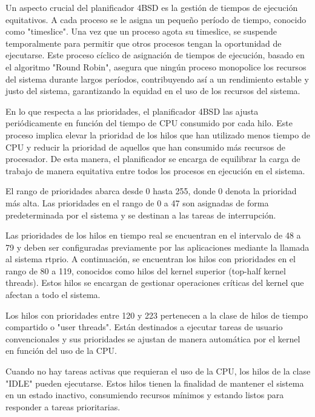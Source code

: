 Un aspecto crucial del planificador 4BSD es la gestión de tiempos de ejecución equitativos. A cada proceso se le asigna un pequeño período de tiempo, conocido como "timeslice". Una vez que un proceso agota su timeslice, se suspende temporalmente para permitir que otros procesos tengan la oportunidad de ejecutarse. Este proceso cíclico de asignación de tiempos de ejecución, basado en el algoritmo "Round Robin", asegura que ningún proceso monopolice los recursos del sistema durante largos períodos, contribuyendo así a un rendimiento estable y justo del sistema,  garantizando la equidad en el uso de los recursos del sistema.\par

En lo que respecta a las prioridades, el planificador 4BSD las ajusta periódicamente en función del tiempo de CPU consumido por cada hilo. Este proceso implica elevar la prioridad de los hilos que han utilizado menos tiempo de CPU y reducir la prioridad de aquellos que han consumido más recursos de procesador. De esta manera, el planificador se encarga de equilibrar la carga de trabajo de manera equitativa entre todos los procesos en ejecución en el sistema.\par

El rango de prioridades abarca desde 0 hasta 255, donde 0 denota la prioridad más alta. Las prioridades en el rango de 0 a 47 son asignadas de forma predeterminada por el sistema y se destinan a las tareas de interrupción.\par

Las prioridades de los hilos en tiempo real se encuentran en el intervalo de 48 a 79 y deben ser configuradas previamente por las aplicaciones mediante la llamada al sistema rtprio. A continuación, se encuentran los hilos con prioridades en el rango de 80 a 119, conocidos como hilos del kernel superior (top-half kernel threads). Estos hilos se encargan de gestionar operaciones críticas del kernel que afectan a todo el sistema.\par

Los hilos con prioridades entre 120 y 223 pertenecen a la clase de hilos de tiempo compartido o "user threads". Están destinados a ejecutar tareas de usuario convencionales y sus prioridades se ajustan de manera automática por el kernel en función del uso de la CPU.\par

Cuando no hay tareas activas que requieran el uso de la CPU, los hilos de la clase "IDLE" pueden ejecutarse. Estos hilos tienen la finalidad de mantener el sistema en un estado inactivo, consumiendo recursos mínimos y estando listos para responder a tareas prioritarias.\par

